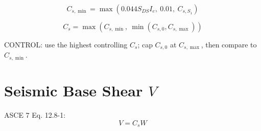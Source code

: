 \documentclass[10pt]{article}
\begin{document}
\begin{equation}
C_{s,\min} = \max\!\left(0.044S_{DS}I_e,\ 0.01,\ C_{s,S_1}\right)
\end{equation}

\begin{equation}
C_s = \max\!\left(C_{s,\min},\ \min(C_{s,0}, C_{s,\max})\right)
\end{equation}

{\ttfamily\footnotesize
CONTROL: use the highest controlling $C_s$; cap $C_{s,0}$ at $C_{s,\max}$, then compare to $C_{s,\min}$.
}

\section{Seismic Base Shear $V$}

ASCE 7 Eq. 12.8-1:
\begin{equation}
V = C_s W
\end{equation}
\end{document}
